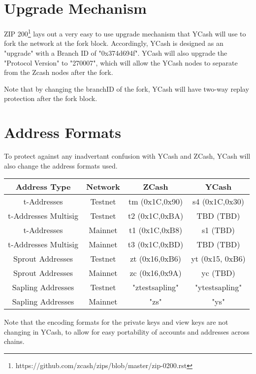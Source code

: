 \documentclass{article}
\begin{document}
\section{Upgrade Mechanism}
ZIP 200\footnote{https://github.com/zcash/zips/blob/master/zip-0200.rst} lays out a very easy to use upgrade mechanism that YCash will use to fork the network at the fork block. Accordingly, YCash is designed as an "upgrade" with a Branch ID of "0x374d694f". YCash will also upgrade the "Protocol Version" to "270007", which will allow the YCash nodes to separate from the Zcash nodes after the fork. 
\par
Note that by changing the branchID of the fork, YCash will have two-way replay protection after the fork block. 

\section{Address Formats}
To protect against any inadvertant confusion with YCash and ZCash, YCash will also change the address formats used. 
\begin{center}
 \begin{tabular}{||c c c c||} 
 \hline
 Address Type & Network & ZCash & YCash \\ [0.5ex] 
 \hline\hline
 t-Addresses & Testnet & tm (0x1C,0x90) & s4 (0x1C,0x30)  \\ 
 \hline
 t-Addresses Multisig & Testnet & t2 (0x1C,0xBA) & TBD (TBD)  \\ 
 \hline
 t-Addresses & Mainnet & t1 (0x1C,0xB8) & s1 (TBD) \\
 \hline
 t-Addresses Multisig & Mainnet & t3 (0x1C,0xBD) & TBD (TBD) \\
 \hline
 \hline
 Sprout Addresses & Testnet & zt (0x16,0xB6) & yt (0x15, 0xB6) \\
 \hline
 Sprout Addresses & Mainnet & zc (0x16,0x9A) & yc (TBD) \\
 \hline
 \hline
 Sapling Addresses & Testnet & "ztestsapling" & "ytestsapling" \\
 \hline
 Sapling Addresses & Mainnet & "zs" & "ys" \\ [1ex] 
 \hline
\end{tabular}
\end{center}

Note that the encoding formats for the private keys and view keys are not changing in YCash, to allow for easy portability of accounts and addresses across chains. 
\end{document}
